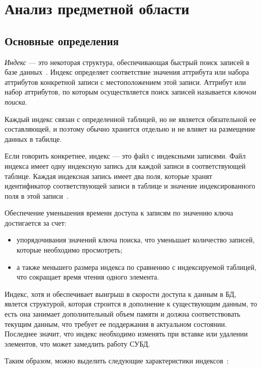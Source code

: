 \chapter{Анализ предметной области}

\section{Основные определения}

\textit{Индекс} --- это некоторая структура, обеспечивающая быстрый поиск
записей в базе данных~\cite{amur}. Индекс определяет соответствие значения
аттрибута или набора аттрибутов конкретной записи с местоположением этой записи.
Аттрибут или набор аттрибутов, по которым осуществляется поиск записей
называется \textit{ключом поиска}.

Каждый индекс связан с определенной таблицей, но не является обязательной ее
составляющей, и поэтому обычно хранится отдельно и не влияет на размещение
данных в табилце.

Если говорить конкретнее, индекс --- это файл с индексными записями. Файл
индекса имеет одну индексную запись для каждой записи в соответствующей таблице.
Каждая индексная запись имеет два поля, которые хранят идентификатор
соответствующей записи в таблице и значение индексированного поля в этой
записи~\cite{syore}.

Обеспечение уменьшения времени доступа к записям по значению ключа достигается
за счет:
\begin{itemize}
    \item упорядочивания значений ключа поиска, что уменьшает количество
        записей, которые необходимо просмотреть;
    \item а также меньшего размера индекса по сравнению с индексируемой
        таблицей, что сокращает время чтения одного элемента.
\end{itemize}

Индекс, хотя и обеспечивает выигрыш в скорости доступа к данным в БД, явлется
структурой, которая строится в дополнение к существующим данным, то есть она
занимает дополнительный объем памяти и должна соответствовать текущим данным,
что требует ее поддержания в актуальном состоянии. Последнее значит, что индекс
необходимо изменять при вставке или удалении элементов, что может замедлить
работу СУБД.

Таким образом, можно выделить следующие характеристики индексов~\cite{ship}:

